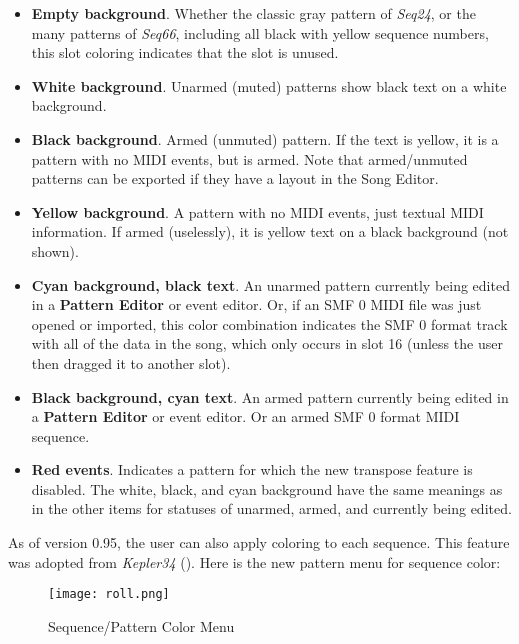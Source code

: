    \begin{itemize}
      \item \textbf{Empty background}.  Whether the classic gray pattern
         of \textsl{Seq24}, or the many patterns of \textsl{Seq66},
         including all black with yellow sequence numbers, this
         slot coloring indicates that the slot is unused.
      \item \textbf{White background}.  Unarmed (muted) patterns show black
         text on a white background.
      \item \textbf{Black background}.  Armed (unmuted) pattern.  If the text
         is yellow, it is a pattern with no MIDI events, but is armed.  Note
         that armed/unmuted patterns can be exported if they have a layout in
         the Song Editor.
      \item \textbf{Yellow background}.  A pattern with no MIDI events, just
         textual MIDI information.  If armed (uselessly), it is yellow text on
         a black background (not shown).
      \item \textbf{Cyan background, black text}.
         An unarmed pattern currently being edited in a 
         \textbf{Pattern Editor} or event
         editor. Or, if an SMF 0 MIDI file was just opened or imported, this
         color combination indicates the SMF 0 format track with all of the
         data in the song, which only occurs in slot 16 (unless the user then
         dragged it to another slot).
      \item \textbf{Black background, cyan text}.
         An armed pattern currently being edited in a 
         \textbf{Pattern Editor} or event
         editor.  Or an armed SMF 0 format MIDI sequence.
      \item \textbf{Red events}.
         Indicates a pattern for which the new transpose feature is
         disabled.  The white, black, and cyan background have the same
         meanings as in the other items for statuses of unarmed, armed, and
         currently being edited.
   \end{itemize}

   As of version 0.95, the user can also apply coloring to each sequence.
   This feature was adopted from \textsl{Kepler34} (\cite{kepler34}).
   Here is the new pattern menu for sequence color:

\begin{figure}[H]
   \centering 
   \texttt{[image: roll.png]}
   \caption{Sequence/Pattern Color Menu}
   \label{fig:pattern_window_sequence_color_menu}
\end{figure}

